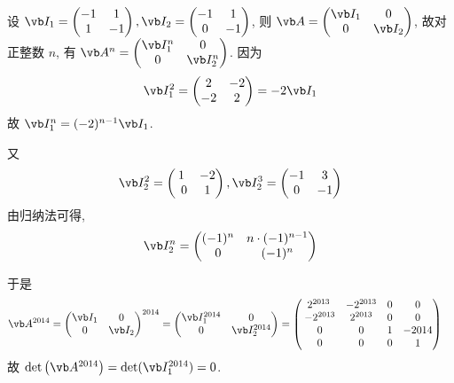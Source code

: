 设 $\vb I_1=\begin{pmatrix}-1&1\\1&-1\end{pmatrix},\vb I_2=\begin{pmatrix}-1&1\\0&-1\end{pmatrix}$, 则 $\vb A=\begin{pmatrix}\vb I_1&0\\0&\vb I_2\end{pmatrix}$,  故对正整数 $n$, 有 $\vb A^n=\begin{pmatrix}\vb I_1^n&0\\0&\vb I_2^n\end{pmatrix}$. 因为
\[
	\vb I_1^2=\begin{pmatrix}2&-2\\ -2&2\end{pmatrix}=-2\vb I_1
\]
故 $\vb I_1^n=(-2)^{n-1}\vb I_1$.

又
\[
	\vb I_2^2=\begin{pmatrix}1&-2\\ \:\:0&1\end{pmatrix},\vb I_2^{3}=\begin{pmatrix}-1&3\\ 0&-1\end{pmatrix}
\]
由归纳法可得, 
\[
	\vb I_2^{n}=\begin{pmatrix}(-1)^{n}&n\cdot (-1)^{n-1}\\0&(-1)^n\end{pmatrix}
\]


于是
\[
\begin{aligned}
	\vb A^{2014}&=\begin{pmatrix}\vb I_1&0\\0&\vb I_2\end{pmatrix}^{2014}=\begin{pmatrix}\vb I_1^{2014}&0\\0&\vb I_2^{2014}\end{pmatrix}=\begin{pmatrix}2^{2013}&-2^{2013}&0&0\\ \:-2^{2013}&2^{2013}&0&0\\ \:0&0&1&-2014\\ \:0&0&0&1\end{pmatrix}
\end{aligned}
\]
故 $\det\left(\vb A^{2014}\right)=\det(\vb I_1^{2014})=0$.